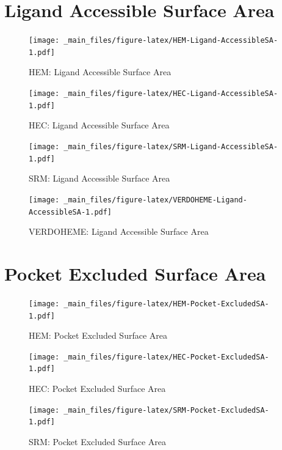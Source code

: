 \documentclass[a4paper, nobind]{templates/ociamthesis}
\begin{document}
\hypertarget{figs-ligAccSA}{%
\section{Ligand Accessible Surface Area}\label{figs-ligAccSA}}

\begin{figure}
\centering
\texttt{[image: \_main\_files/figure-latex/HEM-Ligand-AccessibleSA-1.pdf]}
\caption{\label{fig:HEM-Ligand-AccessibleSA}HEM: Ligand Accessible Surface Area}
\end{figure}

\begin{figure}
\centering
\texttt{[image: \_main\_files/figure-latex/HEC-Ligand-AccessibleSA-1.pdf]}
\caption{\label{fig:HEC-Ligand-AccessibleSA}HEC: Ligand Accessible Surface Area}
\end{figure}

\begin{figure}
\centering
\texttt{[image: \_main\_files/figure-latex/SRM-Ligand-AccessibleSA-1.pdf]}
\caption{\label{fig:SRM-Ligand-AccessibleSA}SRM: Ligand Accessible Surface Area}
\end{figure}

\begin{figure}
\centering
\texttt{[image: \_main\_files/figure-latex/VERDOHEME-Ligand-AccessibleSA-1.pdf]}
\caption{\label{fig:VERDOHEME-Ligand-AccessibleSA}VERDOHEME: Ligand Accessible Surface Area}
\end{figure}

\hypertarget{figs-pocketExcSA}{%
\section{Pocket Excluded Surface Area}\label{figs-pocketExcSA}}

\begin{figure}
\centering
\texttt{[image: \_main\_files/figure-latex/HEM-Pocket-ExcludedSA-1.pdf]}
\caption{\label{fig:HEM-Pocket-ExcludedSA}HEM: Pocket Excluded Surface Area}
\end{figure}

\begin{figure}
\centering
\texttt{[image: \_main\_files/figure-latex/HEC-Pocket-ExcludedSA-1.pdf]}
\caption{\label{fig:HEC-Pocket-ExcludedSA}HEC: Pocket Excluded Surface Area}
\end{figure}

\begin{figure}
\centering
\texttt{[image: \_main\_files/figure-latex/SRM-Pocket-ExcludedSA-1.pdf]}
\caption{\label{fig:SRM-Pocket-ExcludedSA}SRM: Pocket Excluded Surface Area}
\end{figure}
\end{document}
